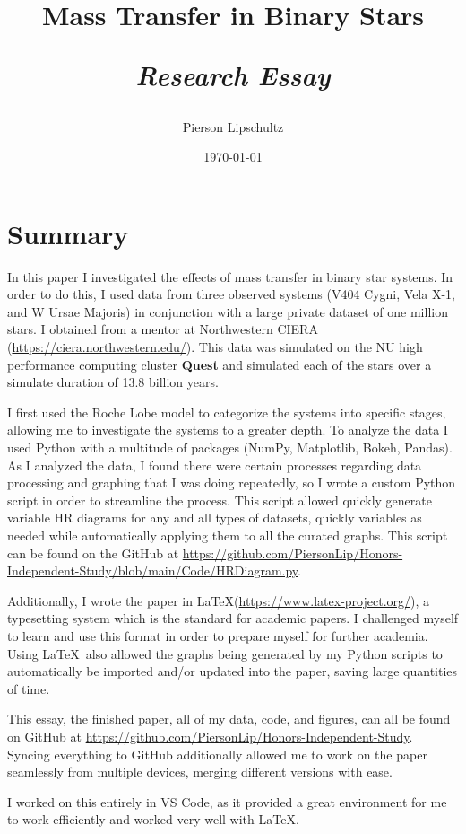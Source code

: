 \documentclass[12pt, a4paper]{article}
\title{Mass Transfer in Binary Stars 

\textit{Research Essay}}
\author{Pierson Lipschultz}
\begin{document}
\date{\today}
\maketitle
\section{Summary}
    In this paper I investigated the effects of mass transfer in binary star systems. In order to do this,  I used data from three observed systems (V404 Cygni, Vela X-1, and W Ursae Majoris) in conjunction with a large private dataset of one million stars. I obtained from a mentor at Northwestern CIERA (\url{https://ciera.northwestern.edu/}). This data was simulated on the NU high performance computing cluster \textbf{Quest} and simulated each of the stars over a simulate duration of 13.8 billion years.

    I first used the Roche Lobe model to categorize the systems into specific stages, allowing me to investigate the systems to a greater depth. To analyze the data I used Python with a multitude of packages (NumPy, Matplotlib, Bokeh, Pandas). As I analyzed the data, I found there were certain processes regarding data processing and graphing that I was doing repeatedly, so I wrote a custom Python script in order to streamline the process. This script allowed quickly generate variable HR diagrams for any and all types of datasets, quickly variables as needed while automatically applying them to all the curated graphs. This script can be found on the GitHub at \url{https://github.com/PiersonLip/Honors-Independent-Study/blob/main/Code/HRDiagram.py}.

	Additionally, I wrote the paper in \LaTeX (\url{https://www.latex-project.org/}), a typesetting system which is the standard for academic papers. I challenged myself to learn and use this format in order to prepare myself for further academia. Using \LaTeX ~also allowed the graphs being generated by my Python scripts to automatically be imported and/or updated into the paper, saving large quantities of time.

	This essay, the finished paper, all of my data, code, and figures, can all be found on GitHub at \url{https://github.com/PiersonLip/Honors-Independent-Study}. Syncing everything to GitHub additionally allowed me to work on the paper seamlessly from multiple devices, merging different versions with ease. 

    I worked on this entirely in VS Code, as it provided a great environment for me to work efficiently and worked very well with \LaTeX.
\end{document}
